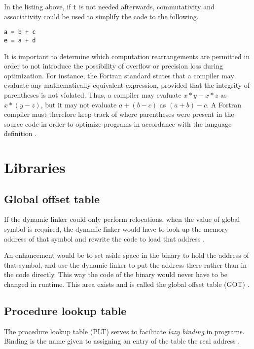 In the listing above, if \texttt{t} is not needed afterwards, commutativity and associativity could be used to simplify the code to the following.

\begin{lstlisting}
a = b + c
e = a + d
\end{lstlisting}

It is important to determine which computation rearrangements are permitted in order to not introduce the possibility of overflow or precision loss during optimization.
For instance, the Fortran standard states that a compiler may evaluate any mathematically equivalent expression, provided that the integrity of parentheses is not violated.
Thus, a compiler may evaluate \(x * y - x * z\) as \(x * (y - z)\), but it may not evaluate \(a + (b - c)\) as \((a + b) - c\).
A Fortran compiler must therefore keep track of where parentheses were present in the source code in order to optimize programs in accordance with the language definition \cite[p.~537]{compilers-aho-2007}.

\section{Libraries}

\subsection{Global offset table}

If the dynamic linker could only perform relocations, when the value of global symbol is required, the dynamic linker would have to look up the memory address of that symbol and rewrite the code to load that address \cite{computer-science-from-the-bottom-up}.

An enhancement would be to set aside space in the binary to hold the address of that symbol, and use the dynamic linker to put the address there rather than in the code directly.
This way the code of the binary would never have to be changed in runtime.
This area exists and is called the global offset table (GOT) \cite{computer-science-from-the-bottom-up}.

\subsection{Procedure lookup table}

The procedure lookup table (PLT) serves to facilitate \textit{lazy binding} in programs.
Binding is the name given to assigning an entry of the table the real address \cite{computer-science-from-the-bottom-up}.

